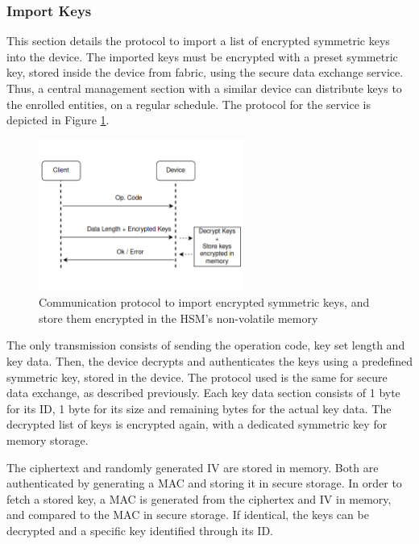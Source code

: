 \subsubsection*{Import Keys}\label{chap:arch:services:new-comms:import}

This section details the protocol to import a list of encrypted symmetric keys into the device.
The imported keys must be encrypted with a preset symmetric key, stored inside the device from fabric, using the secure data exchange service. Thus, a central management section with a similar device can distribute keys to the enrolled entities, on a regular schedule.
The protocol for the service is depicted in Figure \ref{fig:protocol:import-keys}.

\begin{figure}[h!]
	\centering
	\includegraphics[width=0.60\textwidth]{./Images/import-keys.png}
	\caption{Communication protocol to import encrypted symmetric keys, and store them encrypted in the HSM's non-volatile memory}
	\label{fig:protocol:import-keys}
\end{figure}

The only transmission consists of sending the operation code, key set length and key data. Then, the device decrypts and authenticates the keys using a predefined symmetric key, stored in the device. The protocol used is the same for secure data exchange, as described previously.
Each key data section consists of 1 byte for its ID, 1 byte for its size and remaining bytes for the actual key data.
The decrypted list of keys is encrypted again, with a dedicated symmetric key for memory storage. 

The ciphertext and randomly generated IV are stored in memory. Both are authenticated by generating a MAC and storing it in secure storage.
In order to fetch a stored key, a MAC is generated from the ciphertex and IV in memory, and compared to the MAC in secure storage. If identical, the keys can be decrypted and a specific key identified through its ID.

